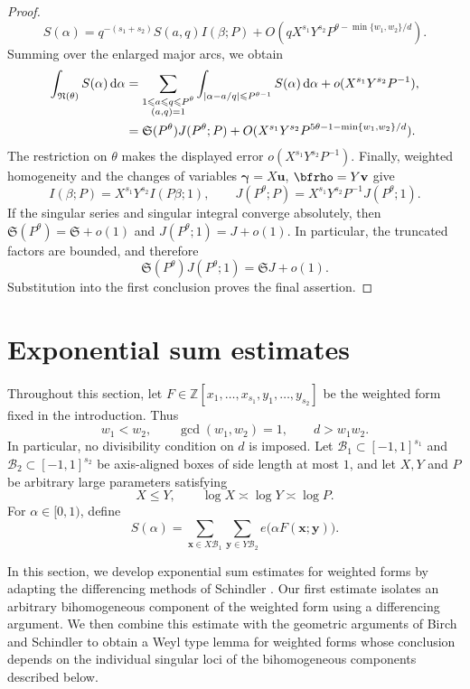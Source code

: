 \documentclass[12pt,reqno]{amsart}
\theoremstyle{definition}
\theoremstyle{remark}
\numberwithin{equation}{section}
\def\bfu{{\mathbf u}}
\def\bfv{{\mathbf v}}
\def\bfx{{\mathbf x}}
\def\bfy{{\mathbf y}}
\def\Z{{\mathbb Z}}\def\Q{{\mathbb Q}}
\def\grN{{\mathfrak N}}\def\grn{{\mathfrak n}}
\def\grS{{\mathfrak S}}\def\grP{{\mathfrak P}}
\def\a{{\alpha}} \def\bfalp{{\boldsymbol \alpha}} \def\atil{{\widetilde \alpha}}
\def\b{{\beta}}  \def\bfbet{{\boldsymbol \beta}}
\def\gam{{\gamma}} \def\Gam{{\Gamma}}
\def\bfgam{{\boldsymbol \gam}} \def\bfgamhat{{\widehat{\bfgam}}}
\def\le{\leqslant} \def\ge{\geqslant} \def\pleq{\preccurlyeq} \def\ple{\prec}
\def\d{{\,{\rm d}}}
\begin{document}
\begin{proof}
\[S(\a) = q^{-(s_1+s_2)}S(a,q)I(\b;P) + O\left(qX^{s_1}Y^{s_2}P^{\theta-\min\{w_1,w_2\}/d} \right).\]
Summing over the enlarged major arcs, we obtain
\begin{align*}
    \int_{\grN(\theta)}S(\a) \d \a &= \sum_{\substack{1 \le a \le q \le P^{\theta} \\ (a,q) = 1}}\int_{|\a - a/q|\le P^{\theta - 1}}S(\a) \d \a +o(X^{s_1}Y^{s_2}P^{-1}), \\
    &= \grS(P^{\theta})J(P^{\theta};P) + O(X^{s_1}Y^{s_2}P^{5\theta-1-\min\{w_1,w_2\}/d }).
\end{align*}
The restriction on $\theta$ makes the displayed error
$o(X^{s_1}Y^{s_2}P^{-1})$. Finally, weighted homogeneity and the changes of
variables $\bfgam=X\bfu$, $\bfrho=Y\bfv$ give
\[
I(\b;P)=X^{s_1}Y^{s_2}I(P\b;1),
\qquad
J(P^\theta;P)=X^{s_1}Y^{s_2}P^{-1}J(P^\theta;1).
\]
If the singular series and singular integral converge absolutely, then
$\grS(P^\theta)=\grS+o(1)$ and $J(P^\theta;1)=J+o(1)$.  In particular,
the truncated factors are bounded, and therefore
\[
    \grS(P^\theta)J(P^\theta;1)=\grS J+o(1).
\]
Substitution into the first conclusion proves the final assertion.
\end{proof}





\section{Exponential sum estimates}\label{section4!}
Throughout this section, let
$F\in\Z[x_1,\ldots,x_{s_1},y_1,\ldots,y_{s_2}]$ be the weighted form
fixed in the introduction. Thus
\[
    w_1<w_2,
    \qquad
    \gcd(w_1,w_2)=1,
    \qquad
    d>w_1w_2.
\]
In particular, no divisibility condition on $d$ is imposed.
Let $\mathcal B_1\subset[-1,1]^{s_1}$ and
$\mathcal B_2\subset[-1,1]^{s_2}$ be axis-aligned boxes of side length at
most $1$, and let $X,Y$ and $P$ be arbitrary
large parameters satisfying
\[
    X\leq Y,
    \qquad
    \log X\asymp\log Y\asymp\log P.
\]
For $\a\in[0,1)$, define
\[
    S(\a)=
    \sum_{\bfx\in X\mathcal B_1}
    \sum_{\bfy\in Y\mathcal B_2}
    e\bigl(\a F(\bfx;\bfy)\bigr).
\]

In this section, we develop exponential sum estimates for weighted forms
by adapting the differencing methods of Schindler \cite{Schindler2014}. Our
first estimate isolates an arbitrary bihomogeneous component of the weighted
form using a differencing argument. We then combine this estimate with the
geometric arguments of Birch and Schindler to obtain a Weyl type lemma for
weighted forms whose conclusion depends on the individual singular loci of the
bihomogeneous components described below.
\end{document}

